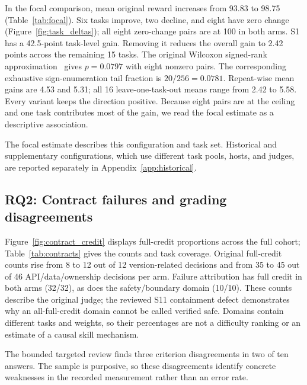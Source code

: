 \documentclass[11pt]{article}
\begin{document}
In the focal comparison, mean original reward increases from 93.83 to 98.75 (Table~\ref{tab:focal}). Six tasks improve, two decline, and eight have zero change (Figure~\ref{fig:task_deltas}); all eight zero-change pairs are at 100 in both arms. S1 has a 42.5-point task-level gain. Removing it reduces the overall gain to 2.42 points across the remaining 15 tasks. The original Wilcoxon signed-rank approximation~\citep{wilcoxon1945individual} gives $p=0.0797$ with eight nonzero pairs. The corresponding exhaustive sign-enumeration tail fraction is $20/256=0.0781$. Repeat-wise mean gains are 4.53 and 5.31; all 16 leave-one-task-out means range from 2.42 to 5.58. Every variant keeps the direction positive. Because eight pairs are at the ceiling and one task contributes most of the gain, we read the focal estimate as a descriptive association.

The focal estimate describes this configuration and task set. Historical and supplementary configurations, which use different task pools, hosts, and judges, are reported separately in Appendix~\ref{app:historical}.

\subsection{RQ2: Contract failures and grading disagreements}\label{sec:rq2}


Figure~\ref{fig:contract_credit} displays full-credit proportions across the full cohort; Table~\ref{tab:contracts} gives the counts and task coverage. Original full-credit counts rise from 8 to 12 out of 12 version-related decisions and from 35 to 45 out of 46 API/data/ownership decisions per arm. Failure attribution has full credit in both arms (32/32), as does the safety/boundary domain (10/10). These counts describe the original judge; the reviewed S11 containment defect demonstrates why an all-full-credit domain cannot be called verified safe. Domains contain different tasks and weights, so their percentages are not a difficulty ranking or an estimate of a causal skill mechanism.

The bounded targeted review finds three criterion disagreements in two of ten answers. The sample is purposive, so these disagreements identify concrete weaknesses in the recorded measurement rather than an error rate.
\end{document}
